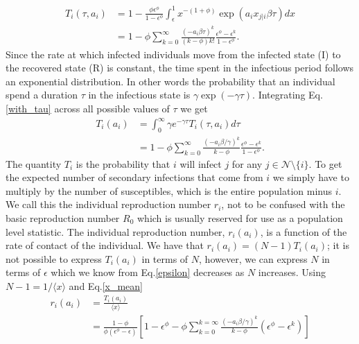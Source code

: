 \documentclass[10pt]{article}
\begin{document}
\begin{multicols}{2}
\begin{equation}
\begin{split}
T_{i}(\tau,a_{i})&=1-\frac{\phi\epsilon^{\phi}}{1-\epsilon^{\phi}}\int_{\epsilon}^{1}x^{-(1+\phi)}\exp(a_{i}x_{j|i}\beta\tau)dx\\
&=1-\phi\sum_{k=0}^{\infty}\frac{(-a_{i}\beta\tau)^{k}}{(k-\phi)k!}\frac{\epsilon^{\phi}-\epsilon^{k}}{1-\epsilon^{\phi}}.
\end{split}
\end{equation}
Since the rate at which infected individuals move from the infected state (I) to the recovered state (R) is constant, the time spent in the infectious period follows an exponential distribution. In other words the probability that an individual spend a duration $\tau$ in the infectious state is $\gamma\exp(-\gamma\tau)$. Integrating Eq.\eqref{with_tau} across all possible values of $\tau$ we get
\begin{equation}
\label{without_tau}
\begin{split}
T_{i}(a_{i})&=\int_{0}^{\infty}\gamma e^{-\gamma\tau}T_{i}(\tau,a_{i})d\tau\\
&=1-\phi\sum_{k=0}^{\infty}\frac{(-a_{i}\beta/\gamma)^{k}}{k-\phi}\frac{\epsilon^{\phi}-\epsilon^{k}}{1-\epsilon^{\phi}}.
\end{split}
\end{equation}
The quantity $T_{i}$ is the probability that $i$ will infect $j$ for any $j\in\mathcal{N}\setminus\{i\}$. To get the expected number of secondary infections that come from $i$ we simply have to multiply by the number of susceptibles, which is the entire population minus $i$. We call this the individual reproduction number $r_{i}$, not to be confused with the basic reproduction number $R_{0}$ which is usually reserved for use as a population level statistic. The individual reproduction number, $r_{i}(a_{i})$, is a function of the rate of contact of the individual. We have that $r_{i}(a_{i})=(N-1)T_{i}(a_{i})$; it is not possible to express $T_{i}(a_{i})$ in terms of $N$, however, we can express $N$ in terms of $\epsilon$ which we know from Eq.\eqref{epsilon} decreases as $N$ increases. Using $N-1=1/\langle x \rangle$ and Eq.\eqref{x_mean}
\begin{equation}
\label{r_i}
\begin{split}
r_{i}(a_{i})&=\frac{T_{i}(a_{i})}{\langle x \rangle}\\
&=\frac{1-\phi}{\phi(\epsilon^{\phi}-\epsilon)}\left[1-\epsilon^{\phi}-\phi\sum_{k=0}^{k=\infty}\frac{(-a_{i}\beta/\gamma)^{k}}{k-\phi}(\epsilon^{\phi}-\epsilon^{k})\right]
\end{split}
\end{equation}

\end{multicols}
\end{document}
